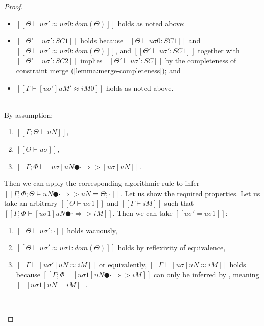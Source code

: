 \begin{proof}
\begin{caseof}
\begin{enumerate}
\begin{itemize}
                        \item $[[Θ ⊢ uσ' ≈ uσ0 : dom(Θ)]]$ holds as noted above;
                        \item $[[Θ' ⊢ uσ' : SC1]]$ holds because $[[Θ ⊢ uσ0 : SC1]]$ and 
                            $[[Θ ⊢ uσ' ≈ uσ0 : dom(Θ)]]$, 
                            and $[[Θ' ⊢ uσ' : SC1]]$ together with $[[Θ' ⊢ uσ' : SC2]]$  
                            implies $[[Θ' ⊢ uσ' : SC]]$ by the completeness of constraint merge 
                            (\cref{lemma:merge-completeness}); and
                        \item $[[Γ ⊢ [uσ']uM' ≈ iM0]]$ holds as noted above.
                    \end{itemize}
            \end{enumerate}

        \item {}\\
            By assumption: 
            \begin{enumerate}
                \item $[[Γ; Θ ⊢ uN]]$,
                \item $[[Θ ⊢ uσ]]$,
                \item $[[Γ; Φ ⊢ [uσ]uN ● · ⇒> [uσ]uN ]]$.
            \end{enumerate}
            Then we can apply the corresponding algorithmic rule
             to infer
            $[[ Γ; Φ; Θ ⊨ uN ● · ⇒> uN ⫤ Θ; · ]]$.
            Let us show the required properties. 
            Let us take an arbitrary 
            $[[Θ ⊢ uσ1]]$ and $[[Γ ⊢ iM]]$
            such that $[[Γ; Φ ⊢ [uσ1]uN ● · ⇒> iM]]$. 
            Then we can take $[[uσ' = uσ1]]$:
            \begin{enumerate}
                \item $[[Θ ⊢ uσ' : ·]]$ holds vacuously,
                \item $[[Θ ⊢ uσ' ≈ uσ1 : dom(Θ)]]$ holds by reflexivity of equivalence,
                \item $[[Γ ⊢ [uσ']uN ≈ iM]]$ or equivalently, 
                    $[[Γ ⊢ [uσ]uN ≈ iM]]$ holds because 
                    $[[Γ; Φ ⊢ [uσ1]uN ● · ⇒> iM]]$ can only be inferred by 
                    , meaning 
                        $[[ [uσ1]uN =  iM ]]$.
            \end{enumerate}
        \item {}\\

\end{caseof}
\end{proof}
